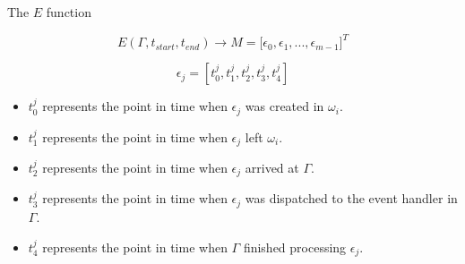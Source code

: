 \documentclass{beamer}
\begin{document}
    \begin{frame}{The $E$ function}

        $$
        E(\Gamma, t_{start}, t_{end}) \to M = \big[ \epsilon_0, \epsilon_1,
        ..., \epsilon_{m-1} \big]^T
        $$

        $$
        \epsilon_j = [ t_0^j, t_1^j, t_2^j, t_3^j, t_4^j ]
        $$

        \begin{itemize}

            \item $t_0^j$ represents the point in time when $\epsilon_j$ was
                created in $\omega_i$.

            \item $t_1^j$ represents the point in time when $\epsilon_j$ left
                $\omega_i$.

            \item $t_2^j$ represents the point in time when $\epsilon_j$
                arrived at $\Gamma$.

            \item $t_3^j$ represents the point in time when $\epsilon_j$ was
                dispatched to the event handler in $\Gamma$.

            \item $t_4^j$ represents the point in time when $\Gamma$ finished
                processing $\epsilon_j$.

        \end{itemize}

    \end{frame}

%
%
%
%
%
\end{document}
